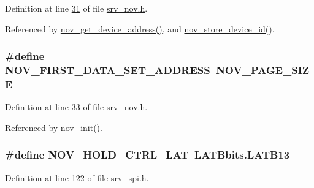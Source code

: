 Definition at line \hyperlink{a00029_source_l00031}{31} of file \hyperlink{a00029_source}{srv\+\_\+nov.\+h}.



Referenced by \hyperlink{a00060_source_l00508}{nov\+\_\+get\+\_\+device\+\_\+address()}, and \hyperlink{a00060_source_l00411}{nov\+\_\+store\+\_\+device\+\_\+id()}.

\hypertarget{a00029_a3d5917eef9709c44acd2e6314619f440}{
\subsubsection[{N\+O\+V\+\_\+\+F\+I\+R\+S\+T\+\_\+\+D\+A\+T\+A\+\_\+\+S\+E\+T\+\_\+\+A\+D\+D\+R\+E\+S\+S}]{\setlength{\rightskip}{0pt plus 5cm}\#define N\+O\+V\+\_\+\+F\+I\+R\+S\+T\+\_\+\+D\+A\+T\+A\+\_\+\+S\+E\+T\+\_\+\+A\+D\+D\+R\+E\+S\+S~{\bf N\+O\+V\+\_\+\+P\+A\+G\+E\+\_\+\+S\+I\+Z\+E}}}\label{a00029_a3d5917eef9709c44acd2e6314619f440}


Definition at line \hyperlink{a00029_source_l00033}{33} of file \hyperlink{a00029_source}{srv\+\_\+nov.\+h}.



Referenced by \hyperlink{a00060_source_l00159}{nov\+\_\+init()}.

\hypertarget{a00029_aa03a6ff293decd7159ed1642ccbac971}{
\subsubsection[{N\+O\+V\+\_\+\+H\+O\+L\+D\+\_\+\+C\+T\+R\+L\+\_\+\+L\+A\+T}]{\setlength{\rightskip}{0pt plus 5cm}\#define N\+O\+V\+\_\+\+H\+O\+L\+D\+\_\+\+C\+T\+R\+L\+\_\+\+L\+A\+T~L\+A\+T\+Bbits.\+L\+A\+T\+B13}}\label{a00029_aa03a6ff293decd7159ed1642ccbac971}


Definition at line \hyperlink{a00013_source_l00122}{122} of file \hyperlink{a00013_source}{srv\+\_\+spi.\+h}.



